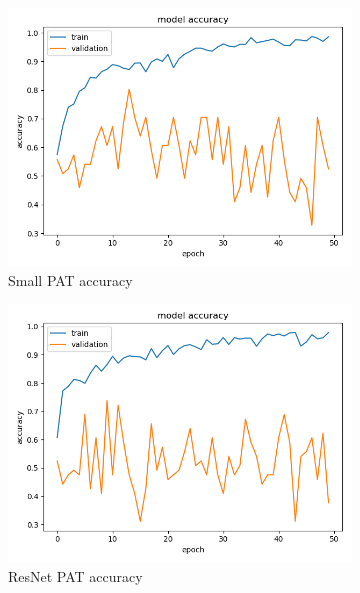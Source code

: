 \begin{figure}[h!]
\begin{subfigure}[b]{.3\linewidth}
\includegraphics[width=\linewidth]{Figs/small_pat_acc.jpg}
\caption{Small PAT accuracy}
\end{subfigure}
\begin{subfigure}[b]{.3\linewidth}
\includegraphics[width=\linewidth]{Figs/resnet_pat_acc.jpg}
\caption{ResNet PAT accuracy}
\end{subfigure}
\begin{subfigure}[b]{.3\linewidth}

\end{subfigure}
\end{figure}

